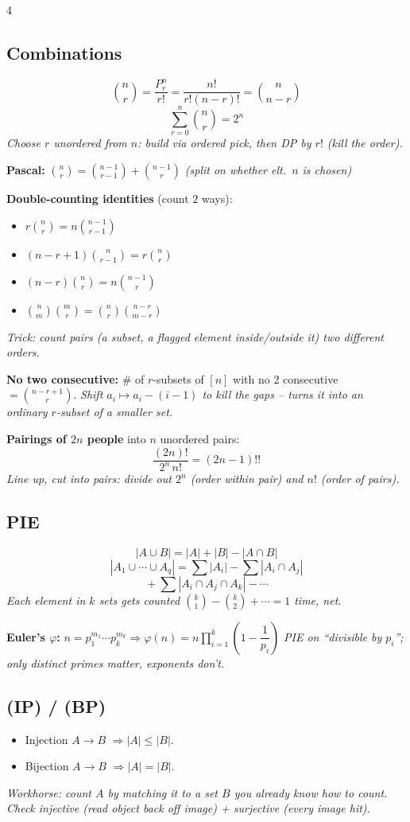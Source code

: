 \documentclass[8pt]{extarticle}
\newcommand{\note}[1]{{\footnotesize\color{gray!70!black}\emph{#1}}}
\begin{document}
\begin{multicols}{4}
\subsection*{Combinations}
\[ \binom{n}{r} = \frac{P^n_r}{r!} = \frac{n!}{r!(n-r)!} = \binom{n}{n-r} \]
\[\sum_{r=0}^n\binom{n}{r}=2^n \]
\note{Choose $r$ unordered from $n$: build via ordered pick, then DP by $r!$ (kill the order).}

\textbf{Pascal:} $\binom{n}{r}=\binom{n-1}{r-1}+\binom{n-1}{r}$ \note{(split on whether elt.\ $n$ is chosen)}

\textbf{Double-counting identities} (count $2$ ways):
\begin{itemize}
\item $r\binom{n}{r}=n\binom{n-1}{r-1}$
\item $(n-r+1)\binom{n}{r-1}=r\binom{n}{r}$
\item $(n-r)\binom{n}{r}=n\binom{n-1}{r}$
\item $\binom{n}{m}\binom{m}{r}=\binom{n}{r}\binom{n-r}{m-r}$
\end{itemize}
\note{Trick: count pairs (a subset, a flagged element inside/outside it) two different orders.}

\textbf{No two consecutive:} \# of $r$-subsets of $[n]$ with no 2 consecutive $=\binom{n-r+1}{r}$.
\note{Shift $a_i\mapsto a_i-(i-1)$ to kill the gaps -- turns it into an ordinary $r$-subset of a smaller set.}

\textbf{Pairings of $2n$ people} into $n$ unordered pairs:
\[ \frac{(2n)!}{2^n\,n!} = (2n-1)!! \]
\note{Line up, cut into pairs: divide out $2^n$ (order within pair) and $n!$ (order of pairs).}

\subsection*{PIE}
\[ |A\cup B| = |A|+|B|-|A\cap B| \]
\[ |A_1\cup\cdots\cup A_q| = \sum|A_i| - \sum|A_i\cap A_j| \]
\[{}+ \sum|A_i\cap A_j\cap A_k| - \cdots \]
\note{Each element in $k$ sets gets counted $\binom{k}{1}-\binom{k}{2}+\cdots = 1$ time, net.}

\textbf{Euler's $\varphi$:} $n=p_1^{m_1}\cdots p_k^{m_k} \Rightarrow \varphi(n)=n\prod_{i=1}^k\left(1-\dfrac1{p_i}\right)$
\note{PIE on ``divisible by $p_i$''; only distinct primes matter, exponents don't.}

\subsection*{(IP) / (BP)}
\begin{itemize}
\item Injection $A\to B$ $\Rightarrow |A|\le|B|$.
\item Bijection $A\to B$ $\Rightarrow |A|=|B|$.
\end{itemize}
\note{Workhorse: count $A$ by matching it to a set $B$ you already know how to count. Check injective (read object back off image) + surjective (every image hit).}


\end{multicols}
\end{document}
